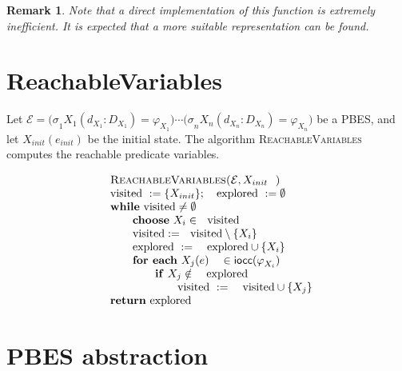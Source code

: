 \documentclass{article}
\newtheorem{remark}[theorem]{Remark}
\begin{document}
\begin{remark}
Note that a direct implementation of this function is extremely inefficient.
It is expected that a more suitable representation can be found.
\end{remark}

\section{\newpage ReachableVariables}

Let $\mathcal{E=(\sigma }_{1}X_{1}(d_{X_{1}}:D_{X_{1}})=\varphi
_{X_{1}})\cdots \mathcal{(\sigma }_{n}X_{n}(d_{X_{n}}:D_{X_{n}})=\varphi
_{X_{n}})$ be a PBES, and let $X_{init}(e_{init})$ be the initial state. The
algorithm \textsc{ReachableVariables} computes the reachable predicate
variables.

\begin{equation*}
\begin{array}{l}
\text{\textsc{ReachableVariables(}}\mathcal{E},X_{init}\text{\textsc{)}} \\ 
\text{visited }:=\{X_{init}\};\text{ explored }:=\emptyset \\ 
\text{\textbf{while} visited}\neq \emptyset \\ 
\qquad \text{\textbf{choose} }X_{i}\in \text{visited} \\ 
\qquad \text{visited}:=\text{visited}\setminus \{X_{i}\} \\ 
\qquad \text{explored }:=\text{ explored}\cup \{X_{i}\} \\ 
\qquad \text{\textbf{for each} }X_{j}(e)\text{ }\in \mathsf{iocc(}\varphi
_{X_{i}}{)} \\ 
\qquad \qquad \text{\textbf{if} }X_{j}\notin \text{ explored} \\ 
\qquad \qquad \qquad \text{visited }:=\text{ visited}\cup \{X_{j}\} \\ 
\text{\textbf{return} explored}%
\end{array}%
\end{equation*}%
\pagebreak

\section{PBES abstraction}
\end{document}
